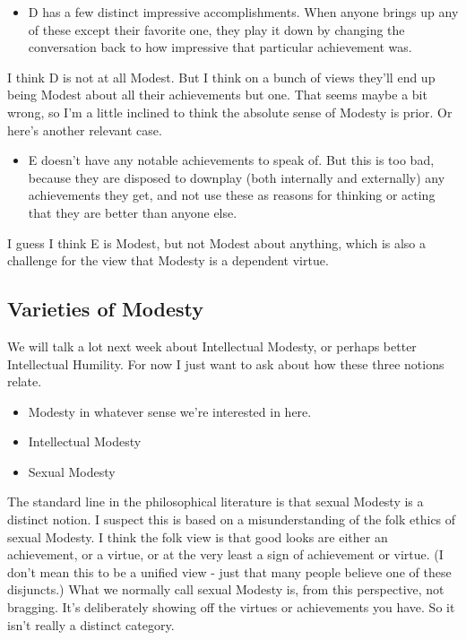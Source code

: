 \documentclass[
]{article}
\providecommand{\tightlist}{%
  \setlength{\itemsep}{0pt}\setlength{\parskip}{0pt}}
\begin{document}
\begin{itemize}
\tightlist
\item
  D has a few distinct impressive accomplishments. When anyone brings up
  any of these except their favorite one, they play it down by changing
  the conversation back to how impressive that particular achievement
  was.
\end{itemize}

I think D is not at all Modest. But I think on a bunch of views they'll
end up being Modest about all their achievements but one. That seems
maybe a bit wrong, so I'm a little inclined to think the absolute sense
of Modesty is prior. Or here's another relevant case.

\begin{itemize}
\tightlist
\item
  E doesn't have any notable achievements to speak of. But this is too
  bad, because they are disposed to downplay (both internally and
  externally) any achievements they get, and not use these as reasons
  for thinking or acting that they are better than anyone else.
\end{itemize}

I guess I think E is Modest, but not Modest about anything, which is
also a challenge for the view that Modesty is a dependent virtue.

\hypertarget{varieties-of-modesty}{%
\subsection{Varieties of Modesty}\label{varieties-of-modesty}}

We will talk a lot next week about Intellectual Modesty, or perhaps
better Intellectual Humility. For now I just want to ask about how these
three notions relate.

\begin{itemize}
\tightlist
\item
  Modesty in whatever sense we're interested in here.
\item
  Intellectual Modesty
\item
  Sexual Modesty
\end{itemize}

The standard line in the philosophical literature is that sexual Modesty
is a distinct notion. I suspect this is based on a misunderstanding of
the folk ethics of sexual Modesty. I think the folk view is that good
looks are either an achievement, or a virtue, or at the very least a
sign of achievement or virtue. (I don't mean this to be a unified view -
just that many people believe one of these disjuncts.) What we normally
call sexual Modesty is, from this perspective, not bragging. It's
deliberately showing off the virtues or achievements you have. So it
isn't really a distinct category.
\end{document}
